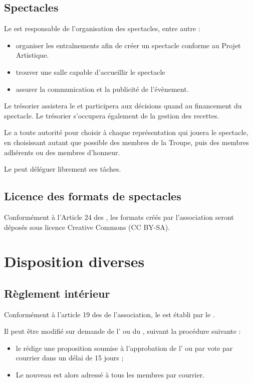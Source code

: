\documentclass[a4paper,french,10pt]{article}
\begin{document}
\subsection{Spectacles}
\label{sec:spectacles}
Le \DA{} est responsable de l'organisation des spectacles, entre autre :
\begin{itemize}
\item organiser les entraînements afin de créer un spectacle conforme au Projet Artistique.
\item trouver une salle capable d'accueillir le spectacle
\item assurer la communication et la publicité de l'évènement.
\end{itemize}

Le trésorier assistera le \DA{} et participera aux décisions quand au financement du spectacle. Le trésorier s'occupera également de la gestion des recettes.

Le \DA{} a toute autorité pour choisir à chaque représentation qui jouera le spectacle, en choisissant autant que possible des membres de la Troupe, puis des membres adhérents ou des membres d'honneur.

Le \DA{} peut déléguer librement ses tâches.

\subsection{Licence des formats de spectacles}
Conformément à l'Article 24 des \statuts{}, les formats créés par l'association seront déposés sous licence Creative Commons (CC BY-SA).


\section{Disposition diverses}
\subsection{Règlement intérieur}
Conformément à l'article 19 des \statuts{} de l'association, le \RI{} est établi par le \bureau{}.

Il peut être modifié sur demande de l'\AG{} ou du \bureau{}, suivant la procédure suivante :
\begin{itemize}
\item le \bureau{} rédige une proposition soumise à l'approbation de l'\AG{} ou par vote par courrier dans un délai de 15 jours ;
\item Le nouveau \RI{} est alors adressé à tous les membres par courrier.
\end{itemize}
\end{document}
